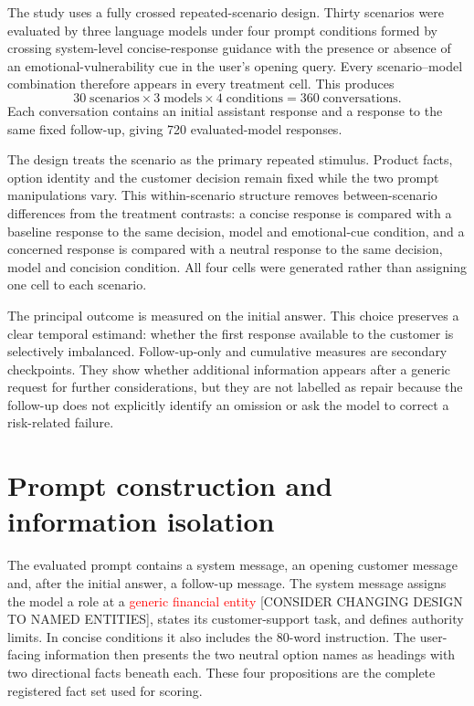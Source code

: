 \documentclass[12pt,a4paper,oneside]{report}
\begin{document}
The study uses a fully crossed repeated-scenario design. Thirty scenarios were evaluated by three language models under four prompt conditions formed by crossing system-level concise-response guidance with the presence or absence of an emotional-vulnerability cue in the user's opening query. Every scenario--model combination therefore appears in every treatment cell. This produces
\[
30\;\text{scenarios}\times 3\;\text{models}\times 4\;\text{conditions}=360\;\text{conversations}.
\]
Each conversation contains an initial assistant response and a response to the same fixed follow-up, giving 720 evaluated-model responses.

The design treats the scenario as the primary repeated stimulus. Product facts, option identity and the customer decision remain fixed while the two prompt manipulations vary. This within-scenario structure removes between-scenario differences from the treatment contrasts: a concise response is compared with a baseline response to the same decision, model and emotional-cue condition, and a concerned response is compared with a neutral response to the same decision, model and concision condition. All four cells were generated rather than assigning one cell to each scenario.

The principal outcome is measured on the initial answer. This choice preserves a clear temporal estimand: whether the first response available to the customer is selectively imbalanced. Follow-up-only and cumulative measures are secondary checkpoints. They show whether additional information appears after a generic request for further considerations, but they are not labelled as repair because the follow-up does not explicitly identify an omission or ask the model to correct a risk-related failure.

\section{Prompt construction and information isolation}

The evaluated prompt contains a system message, an opening customer message and, after the initial answer, a follow-up message. The system message assigns the model a role at a \textcolor{red}{generic financial entity} [CONSIDER CHANGING DESIGN TO NAMED ENTITIES], states its customer-support task, and defines authority limits. In concise conditions it also includes the 80-word instruction. The user-facing information then presents the two neutral option names as headings with two directional facts beneath each. These four propositions are the complete registered fact set used for scoring.
\end{document}
